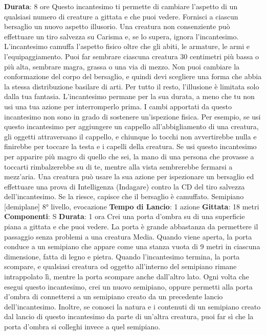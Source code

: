 \begin{multicols}{2}
\textbf{Durata}: 8 ore
Questo incantesimo ti permette di cambiare l’aspetto di
un qualsiasi numero di creature a gittata e che puoi
vedere. Fornisci a ciascun bersaglio un nuovo aspetto
illusorio. Una creatura non consenziente può effettuare
un tiro salvezza su Carisma e, se lo supera, ignora
l’incantesimo.
L’incantesimo camuffa l’aspetto fisico oltre che gli abiti,
le armature, le armi e l’equipaggiamento. Puoi far
sembrare ciascuna creatura 30 centimetri più bassa o
più alta, sembrare magra, grassa o una via di mezzo.
Non puoi cambiare la conformazione del corpo del
bersaglio, e quindi devi scegliere una forma che abbia
la stessa distribuzione basilare di arti. Per tutto il resto,
l’illusione è limitata solo dalla tua fantasia.
L’incantesimo permane per la sua durata, a meno che
tu non usi una tua azione per interromperlo prima.
I cambi apportati da questo incantesimo non sono in
grado di sostenere un’ispezione fisica. Per esempio, se
usi questo incantesimo per aggiungere un cappello
all’abbigliamento di una creatura, gli oggetti
attraversano il cappello, e chiunque lo tocchi non
avvertirebbe nulla e finirebbe per toccare la testa e i
capelli della creatura. Se usi questo incantesimo per
apparire più magro di quello che sei, la mano di una
persona che provasse a toccarti rimbalzerebbe su di te,
mentre alla vista sembrerebbe fermarsi a mezz’aria.
Una creatura può usare la sua azione per ispezionare
un bersaglio ed effettuare una prova di Intelligenza
(Indagare) contro la CD del tiro salvezza 
dell’incantesimo. Se la riesce, capisce che il bersaglio è
camuffato.
Semipiano
[demiplane]
8° livello, evocazione
\textbf{Tempo di Lancio}: 1 azione
\textbf{Gittata}: 18 metri
\textbf{Componenti}: S
\textbf{Durata}: 1 ora
Crei una porta d’ombra su di una superficie piana a
gittata e che puoi vedere. La porta è grande
abbastanza da permettere il passaggio senza problemi
a una creatura Media. Quando viene aperta, la porta
conduce a un semipiano che appare come una stanza
vuota di 9 metri in ciascuna dimensione, fatta di legno e
pietra. Quando l’incantesimo termina, la porta
scompare, e qualsiasi creatura od oggetto all’interno del
semipiano rimane intrappolato lì, mentre la porta
scompare anche dall’altro lato.
Ogni volta che esegui questo incantesimo, crei un
nuovo semipiano, oppure permetti alla porta d’ombra di
connettersi a un semipiano creato da un precedente
lancio dell’incantesimo. Inoltre, se conosci la natura e i
contenuti di un semipiano creato dal lancio di questo
incantesimo da parte di un’altra creatura, puoi far sì che
la porta d’ombra si colleghi invece a quel semipiano.

\end{multicols}

